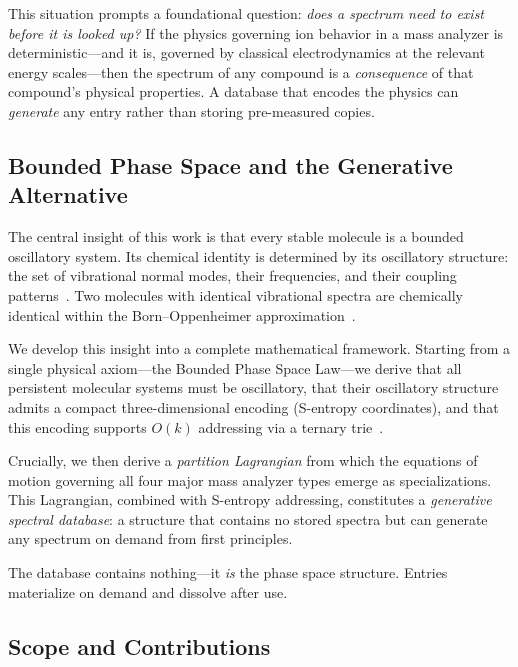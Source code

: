 \documentclass[11pt,twocolumn,a4paper]{article}
\theoremstyle{definition}
\theoremstyle{remark}
\begin{document}
This situation prompts a foundational question: \emph{does a spectrum need to exist before it is looked up?} If the physics governing ion behavior in a mass analyzer is deterministic---and it is, governed by classical electrodynamics at the relevant energy scales---then the spectrum of any compound is a \emph{consequence} of that compound's physical properties. A database that encodes the physics can \emph{generate} any entry rather than storing pre-measured copies.

\subsection{Bounded Phase Space and the Generative Alternative}
\label{sec:generative-alternative}

The central insight of this work is that every stable molecule is a bounded oscillatory system. Its chemical identity is determined by its oscillatory structure: the set of vibrational normal modes, their frequencies, and their coupling patterns~\citep{wilson1955, herzberg1945}. Two molecules with identical vibrational spectra are chemically identical within the Born--Oppenheimer approximation~\citep{born1927}.

We develop this insight into a complete mathematical framework. Starting from a single physical axiom---the Bounded Phase Space Law---we derive that all persistent molecular systems must be oscillatory, that their oscillatory structure admits a compact three-dimensional encoding (S-entropy coordinates), and that this encoding supports $O(k)$ addressing via a ternary trie~\citep{fredkin1960}.

Crucially, we then derive a \emph{partition Lagrangian} from which the equations of motion governing all four major mass analyzer types emerge as specializations. This Lagrangian, combined with S-entropy addressing, constitutes a \emph{generative spectral database}: a structure that contains no stored spectra but can generate any spectrum on demand from first principles.

The database contains nothing---it \emph{is} the phase space structure. Entries materialize on demand and dissolve after use.

\subsection{Scope and Contributions}
\label{sec:contributions}
\end{document}
